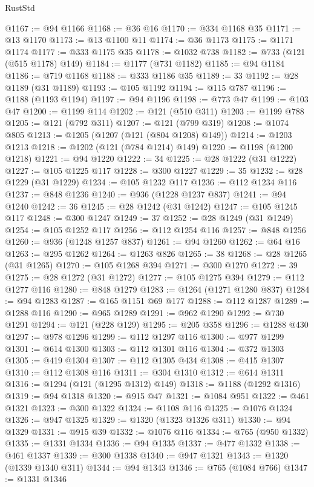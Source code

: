 \begin{lexlean}{RustStd}
\begin{coremodule}
@1167 := @94 @1166
@1168 := @36 @16
@1170 := @334 @1168 @35
@1171 := @13 @1170
@1173 := @13 @1100 @11
@1174 := @36 @1173
@1175 := @1171 @1174
@1177 := @333 @1175 @35
@1178 := @1032 @738
@1182 := @733 (@121 (@515 @1178) @149)
@1184 := @1177 (@731 @1182)
@1185 := @94 @1184
@1186 := @719 @1168
@1188 := @333 @1186 @35
@1189 := 33
@1192 := @28 @1189 (@31 @1189)
@1193 := @105 @1192
@1194 := @115 @787
@1196 := @1188 (@1193 @1194)
@1197 := @94 @1196
@1198 := @773 @47
@1199 := @103 @47
@1200 := @1199 @114
@1202 := @121 (@510 @311)
@1203 := @1199 @788
@1205 := @121 (@792 @311)
@1207 := @121 (@799 @319)
@1208 := @1074 @805
@1213 := @1205 (@1207 (@121 (@804 @1208) @149))
@1214 := @1203 @1213
@1218 := @1202 (@121 (@784 @1214) @149)
@1220 := @1198 (@1200 @1218)
@1221 := @94 @1220
@1222 := 34
@1225 := @28 @1222 (@31 @1222)
@1227 := @105 @1225 @117
@1228 := @300 @1227
@1229 := 35
@1232 := @28 @1229 (@31 @1229)
@1234 := @105 @1232 @117
@1236 := @112 @1234 @116
@1237 := @848 @1236
@1240 := @936 (@1228 @1237 @837)
@1241 := @94 @1240
@1242 := 36
@1245 := @28 @1242 (@31 @1242)
@1247 := @105 @1245 @117
@1248 := @300 @1247
@1249 := 37
@1252 := @28 @1249 (@31 @1249)
@1254 := @105 @1252 @117
@1256 := @112 @1254 @116
@1257 := @848 @1256
@1260 := @936 (@1248 @1257 @837)
@1261 := @94 @1260
@1262 := @64 @16
@1263 := @295 @1262
@1264 := @1263 @826
@1265 := 38
@1268 := @28 @1265 (@31 @1265)
@1270 := @105 @1268 @394
@1271 := @300 @1270
@1272 := 39
@1275 := @28 @1272 (@31 @1272)
@1277 := @105 @1275 @394
@1279 := @112 @1277 @116
@1280 := @848 @1279
@1283 := @1264 (@1271 @1280 @837)
@1284 := @94 @1283
@1287 := @165 @1151 @69 @177
@1288 := @112 @1287
@1289 := @1288 @116
@1290 := @965 @1289
@1291 := @962 @1290
@1292 := @730 @1291
@1294 := @121 (@228 @129)
@1295 := @205 @358
@1296 := @1288 @430
@1297 := @978 @1296
@1299 := @112 @1297 @116
@1300 := @977 @1299
@1301 := @614 @1300
@1303 := @112 @1301 @116
@1304 := @372 @1303
@1305 := @419 @1304
@1307 := @112 @1305 @434
@1308 := @415 @1307
@1310 := @112 @1308 @116
@1311 := @304 @1310
@1312 := @614 @1311
@1316 := @1294 (@121 (@1295 @1312) @149)
@1318 := @1188 (@1292 @1316)
@1319 := @94 @1318
@1320 := @915 @47
@1321 := @1084 @951
@1322 := @461 @1321
@1323 := @300 @1322
@1324 := @1108 @116
@1325 := @1076 @1324
@1326 := @947 @1325
@1329 := @1320 (@1323 @1326 @311)
@1330 := @94 @1329
@1331 := @915 @39
@1332 := @1076 @116
@1334 := @765 (@950 @1332)
@1335 := @1331 @1334
@1336 := @94 @1335
@1337 := @477 @1332
@1338 := @461 @1337
@1339 := @300 @1338
@1340 := @947 @1321
@1343 := @1320 (@1339 @1340 @311)
@1344 := @94 @1343
@1346 := @765 (@1084 @766)
@1347 := @1331 @1346

\end{coremodule}
\end{lexlean}
